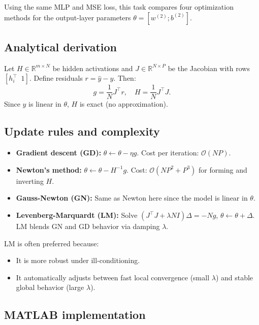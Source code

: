 \documentclass[11pt,a4paper]{article}
\begin{document}
Using the same MLP and MSE loss, this task compares four optimization methods
for the output-layer parameters $\theta = [w^{(2)}; b^{(2)}]$.

\subsection*{Analytical derivation}
Let $H \in \mathbb{R}^{m \times N}$ be hidden activations and
$J \in \mathbb{R}^{N \times P}$ be the Jacobian with rows
$[h_i^{\top} \;\; 1]$. Define residuals $r = \hat{y} - y$.
Then:
\[
g = \frac{1}{N} J^{\top} r, \quad
H = \frac{1}{N} J^{\top} J.
\]
Since $\hat{y}$ is linear in $\theta$, $H$ is exact (no approximation).

\subsection*{Update rules and complexity}

\begin{itemize}
  \item \textbf{Gradient descent (GD):}
        $\theta \leftarrow \theta - \eta g$.
        Cost per iteration: $\mathcal{O}(N P)$.

  \item \textbf{Newton's method:}
        $\theta \leftarrow \theta - H^{-1} g$.
        Cost: $\mathcal{O}(N P^2 + P^3)$ for forming and inverting $H$.

  \item \textbf{Gauss-Newton (GN):}
        Same as Newton here since the model is linear in $\theta$.

  \item \textbf{Levenberg-Marquardt (LM):}
        Solve $(J^{\top} J + \lambda N I) \Delta = -N g$,
        $\theta \leftarrow \theta + \Delta$.
        LM blends GN and GD behavior via damping $\lambda$.
\end{itemize}

LM is often preferred because:
\begin{itemize}
  \item It is more robust under ill-conditioning.
  \item It automatically adjusts between fast local convergence (small $\lambda$)
        and stable global behavior (large $\lambda$).
\end{itemize}

\subsection*{MATLAB implementation}
\end{document}
